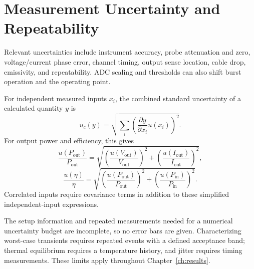 \section{Measurement Uncertainty and Repeatability}
\label{sec:method-uncertainty}

Relevant uncertainties include instrument accuracy, probe attenuation and
zero, voltage/current phase error, channel timing, output sense location,
cable drop, emissivity, and repeatability. ADC scaling and thresholds can
also shift burst operation and the operating point.

For independent measured inputs \(x_i\), the combined standard uncertainty
of a calculated quantity \(y\) is
\begin{equation}
 u_c(y)=
 \sqrt{\sum_i
 \left(\frac{\partial y}{\partial x_i}u(x_i)\right)^2}.
 \label{eq:uncertainty-propagation}
\end{equation}
For output power and efficiency, this gives
\begin{equation}
 \frac{u(P_{\mathrm{out}})}{P_{\mathrm{out}}}
 =
 \sqrt{\left(\frac{u(V_{\mathrm{out}})}{V_{\mathrm{out}}}\right)^2+
 \left(\frac{u(I_{\mathrm{out}})}{I_{\mathrm{out}}}\right)^2},
 \label{eq:pout-uncertainty}
\end{equation}
\begin{equation}
 \frac{u(\eta)}{\eta}
 =
 \sqrt{\left(\frac{u(P_{\mathrm{out}})}{P_{\mathrm{out}}}\right)^2+
 \left(\frac{u(P_{\mathrm{in}})}{P_{\mathrm{in}}}\right)^2}.
 \label{eq:eta-uncertainty}
\end{equation}
Correlated inputs require covariance terms in addition to these simplified
independent-input expressions.

The setup information and repeated measurements needed for a numerical uncertainty budget are incomplete, so no error bars are given. Characterizing worst-case transients requires repeated events with a defined acceptance band; thermal equilibrium requires a temperature history, and jitter requires timing measurements. These limits apply throughout Chapter~\ref{ch:results}.
